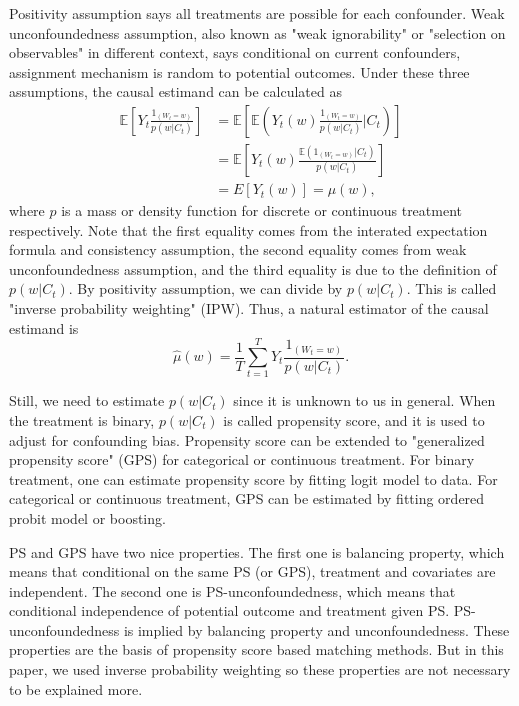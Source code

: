 \documentclass[12pt]{article}
\begin{document}
Positivity assumption says all treatments are possible for each confounder.
Weak unconfoundedness assumption, 
also known as "weak ignorability" or "selection on observables" in different context, says
conditional on current confounders, assignment mechanism is random to potential outcomes.
Under these three assumptions, the causal estimand can be calculated as
\[
	\begin{split}
		\mathbb{E}\left[ Y_t\frac{1_{(W_t = w)}}{p(w\lvert C_t)} \right]
		& = \mathbb{E}\left[ \mathbb{E}\left( Y_t(w) \frac{1_{(W_t = w)}}{p(w\lvert C_t)} \lvert C_t\right)\right]\\
		& = \mathbb{E}\left[ Y_t(w)\frac{\mathbb{E}\left( 1_{(W_t = w)}\lvert C_t \right)}{p(w\lvert C_t)} \right]\\
		& = E\left[ Y_t(w) \right] = \mu(w),
	\end{split}
\]
where $p$ is a mass or density function for discrete or continuous treatment respectively.
Note that the first equality comes from the interated expectation formula and consistency assumption,
the second equality comes from weak unconfoundedness assumption,
and the third equality is due to the definition of $p(w\lvert C_t)$.
By positivity assumption, we can divide by $p(w\lvert C_t)$.
This is called "inverse probability weighting" (IPW).
Thus, a natural estimator of the causal estimand is
\[
	\hat{\mu}(w) = \frac{1}{T}\sum_{t = 1}^T Y_t \frac{1_{(W_t = w)}}{p(w\lvert C_t)}.	
\]

Still, we need to estimate $p(w\lvert C_t)$ since it is unknown to us in general.
When the treatment is binary, $p(w\lvert C_t)$ is called propensity score,
and it is used to adjust for confounding bias\cite{rosenbaum1983}.
Propensity score can be extended to 
"generalized propensity score" (GPS) for categorical or continuous treatment\cite{imbens2000}.
For binary treatment, one can estimate propensity score by fitting logit model to data.
For categorical or continuous treatment, GPS can be estimated by fitting ordered probit model or boosting.

PS and GPS have two nice properties\cite{rosenbaum1983, hirano2004}.
The first one is balancing property, which means that conditional on the same PS (or GPS),
treatment and covariates are independent.
The second one is PS-unconfoundedness, 
which means that conditional independence of potential outcome and treatment given PS.
PS-unconfoundedness is implied by balancing property and unconfoundedness.
These properties are the basis of propensity score based matching methods.
But in this paper, 
we used inverse probability weighting so these properties are not necessary to be explained more.
\end{document}
